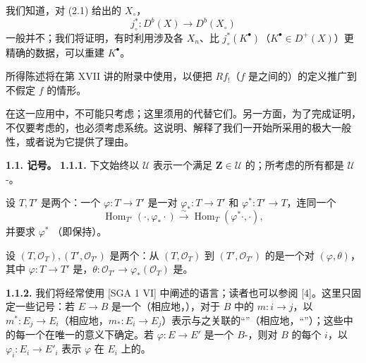 我们知道，对 (2.1) 给出的 $X_\circ$，
\[
j_\circ^*:D^b(X)\longrightarrow D^b(X_\circ)
\]
一般并不；我们将证明，有时利用涉及各 $X_n$、比 $j_\circ^*(K^\bullet)$（$K^\bullet\in D^+(X)$）更精确的数据，可以重建 $K^\bullet$。

所得陈述将在第 XVII 讲的附录中使用，以便把 $Rf_!$（$f$ 是之间的）的定义推广到不假定 $f$ 的情形。

在这一应用中，不可能只考虑；这里须用的代替它们。另一方面，为了完成证明，不仅要考虑的，也必须考虑系统。这说明、解释了我们一开始所采用的极大一般性，或者说为它提供了理由。

\textbf{1.1. 记号。}
\textbf{1.1.1.} 下文始终以 $\mathcal U$ 表示一个满足 $\mathbf Z\in\mathcal U$ 的；所考虑的所有都是 $\mathcal U$-。

设 $T,T'$ 是两个：一个 $\varphi:T\to T'$ 是一对 $\varphi_*:T\to T'$ 和 $\varphi^*:T'\to T$，连同一个
\[
\operatorname{Hom}_{T'}(\cdot,\varphi_*\cdot)
\xrightarrow{\sim}\operatorname{Hom}_T(\varphi^*\cdot,\cdot),
\]
并要求 $\varphi^*$ （即保持）。

设 $(T,\mathcal O_T),(T',\mathcal O_{T'})$ 是两个：从 $(T,\mathcal O_T)$ 到 $(T',\mathcal O_{T'})$ 的是一个对 $(\varphi,\theta)$，其中 $\varphi:T\to T'$ 是，$\theta:\mathcal O_{T'}\to\varphi_*(\mathcal O_T)$ 是。

\textbf{1.1.2.} 我们将经常使用 [SGA 1 VI] 中阐述的语言；读者也可以参阅 [4]。这里只固定一些记号：若 $E\to B$ 是一个（相应地，），对于 $B$ 中的 $m:i\to j$，以 $m^*:E_j\to E_i$（相应地，$m_*:E_i\to E_j$）表示与之关联的“”（相应地，“”）；这些中的每一个在唯一的意义下确定。若 $\varphi:E\to E'$ 是一个 $B$-，则对 $B$ 的每个 $i$，以 $\varphi_i:E_i\to E'_i$ 表示 $\varphi$ 在 $E_i$ 上的。


